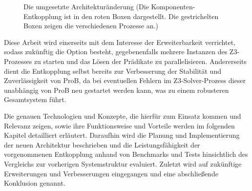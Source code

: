 \begin{figure}[!htp]
    \caption{Die umgesetzte Architekturänderung (Die Komponenten-Entkopplung ist in den roten Boxen dargestellt. Die gestrichelten Boxen zeigen die verschiedenen Prozesse an.)}
    \label{fig:architecture}
\end{figure}
\FloatBarrier

Diese Arbeit wird einerseits mit dem Interesse der Erweiterbarkeit verrichtet, sodass zukünftig die Option besteht,
gegebenenfalls mehrere Instanzen des Z3-Prozesses zu starten und das Lösen der Prädikate zu parallelisieren.
Andererseits dient die Entkopplung selbst bereits zur Verbesserung der Stabilität und Zuverlässigkeit von ProB,
da bei eventuellen Fehlern im Z3-Solver-Prozess dieser unabhängig von ProB neu gestartet werden kann,
was zu einem robusteren Gesamtsystem führt.

Die genauen Technologien und Konzepte, die hierfür zum Einsatz kommen und Relevanz zeigen,
sowie ihre Funktionsweise und Vorteile werden im folgenden Kapitel detailliert erläutert.
Daraufhin wird die Planung und Implementierung der neuen Architektur beschrieben
und die Leistungsfähigkeit der vorgenommenen Entkopplung anhand von Benchmarks und Tests hinsichtlich des Vergleichs zur vorherigen Systemstruktur evaluiert.
Zuletzt wird auf zukünftige Erweiterungen und Verbesserungen eingegangen
und eine abschließende Konklusion genannt.
